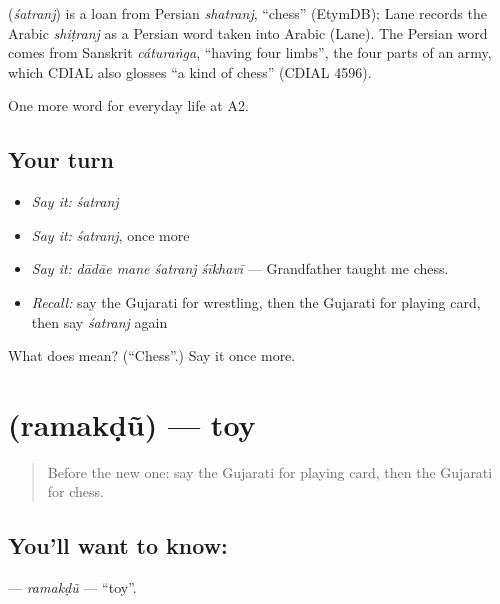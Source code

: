 \begin{cousinweb}
\textbf{} (\emph{śatranj}) is a loan from Persian \emph{shatranj}, \textquotedblleft{}chess\textquotedblright{} (EtymDB); Lane records the Arabic \emph{shiṭranj} as a Persian word taken into Arabic (Lane). The Persian word comes from Sanskrit \emph{cáturaṅga}, \textquotedblleft{}having four limbs\textquotedblright{}, the four parts of an army, which CDIAL also glosses \textquotedblleft{}a kind of chess\textquotedblright{} (CDIAL 4596).
\end{cousinweb}

\begin{grammarlens}[title={What you've built}]
One more word for everyday life at A2.
\end{grammarlens}

\subsection*{Your turn}
\begin{itemize}
\raggedright
  \item \emph{Say it:} \emph{śatranj}
  \item \emph{Say it:} \emph{śatranj}, once more
  \item \emph{Say it:} \emph{dādāe mane śatranj śīkhavī} — Grandfather taught me chess.
  \item \emph{Recall:} say the Gujarati for wrestling, then the Gujarati for playing card, then say \emph{śatranj} again
\end{itemize}

\begin{tcolorbox}[breakable,colback=teal!4,colframe=teal!35!black,title={Before you move on}]
What does  mean? (\textquotedblleft{}Chess\textquotedblright{}.) Say it once more.
\end{tcolorbox}
\section[\texorpdfstring{\gu{રમકડું} (ramakḍũ)}{રમકડું (ramakḍũ)}]{ (ramakḍũ) — toy}

\label{lesson:GU-C260-ramakdu}



\begin{quote}
Before the new one: say the Gujarati for playing card, then the Gujarati for chess.
\end{quote}

\subsection*{You'll want to know: }
\textbf{} — \emph{ramakḍũ} — \textquotedblleft{}toy\textquotedblright{}.

